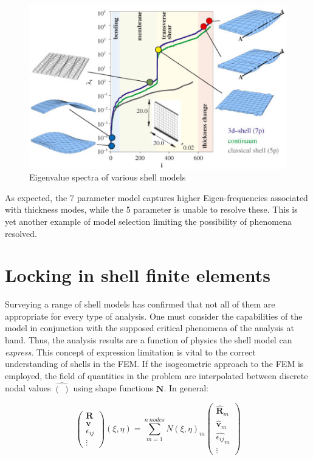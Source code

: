 \begin{figure}[H]
	\centering
	\def\svgwidth{\columnwidth}
	\includegraphics[width=12cm]{images/eigenvaluespectra.png}
	\caption{Eigenvalue spectra of various shell models \cite{RammLitBook04}}
	\label{shelleigenvaluespectra}
\end{figure}

As expected, the 7 parameter model captures higher Eigen-frequencies associated with thickness modes, while the 5 parameter is unable to resolve these. This is yet another example of model selection limiting the possibility of phenomena resolved.

\section{Locking in shell finite elements}

Surveying a range of shell models has confirmed that not all of them are appropriate for every type of analysis. One must consider the capabilities of the model in conjunction with the supposed critical phenomena of the analysis at hand. Thus, the analysis results are a function of physics the shell model can \textit{express}. This concept of expression limitation is vital to the correct understanding of shells in the FEM. If the isogeometric approach to the FEM is employed, the field of quantities in the problem are interpolated between discrete nodal values $\hat{(\ )}$ using shape functions $\mathbf{N}$. In general:

\begin{equation} 
\begin{pmatrix}
\mathbf{R} \\
\mathbf{v} \\
\epsilon_{ij} \\
\vdots
\end{pmatrix}
(\xi,\eta)
=
\sum_{m=1}^{n\ nodes}
N(\xi,\eta)_m
{\begin{pmatrix}
	\hat{\mathbf{R}}_m \\
	\hat{\mathbf{v}}_m \\
	\hat{\epsilon_{ij}}_m \\
	\vdots
	\end{pmatrix}}
\label{eqfemtech1}
\end{equation}

